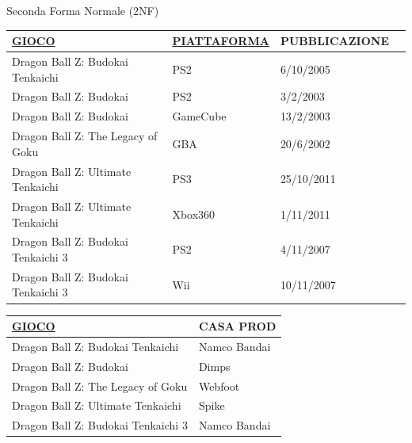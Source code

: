 \begin{frame}{Seconda Forma Normale (2NF)}
\begin{minipage}[t]{0.45\textwidth}
    \tiny
    \begin{tabular}{| p{1.5cm} | p{2cm} | p{2cm} | p{1.5cm} |}
        \hline
        \rowcolor{cyan!30} \textbf{\underline{GIOCO}} & \textbf{\underline{PIATTAFORMA}} & \textbf{PUBBLICAZIONE} \\ \hline
        Dragon Ball Z: Budokai Tenkaichi & PS2 & 6/10/2005 \\ \hline
        Dragon Ball Z: Budokai & PS2 & 3/2/2003 \\ \hline
        Dragon Ball Z: Budokai & GameCube & 13/2/2003 \\ \hline
        Dragon Ball Z: The Legacy of Goku & GBA & 20/6/2002 \\ \hline
        Dragon Ball Z: Ultimate Tenkaichi & PS3 & 25/10/2011 \\ \hline
        Dragon Ball Z: Ultimate Tenkaichi & Xbox360 & 1/11/2011 \\ \hline
        Dragon Ball Z: Budokai Tenkaichi 3 & PS2 & 4/11/2007 \\ \hline
        Dragon Ball Z: Budokai Tenkaichi 3 & Wii & 10/11/2007 \\ \hline
    \end{tabular}
\end{minipage}
\hfill
\begin{minipage}[t]{0.45\textwidth}
\begin{table}[h]
    \centering
    \scriptsize
    \vspace{-3cm}
    \begin{tabular}{| p{1.5cm} | p{1.5cm} |}
        \hline
        \rowcolor{cyan!30} \textbf{\underline{GIOCO}} & \textbf{CASA PROD} \\ \hline
        Dragon Ball Z: Budokai Tenkaichi & Namco Bandai \\ \hline
        Dragon Ball Z: Budokai & Dimps \\ \hline
        Dragon Ball Z: The Legacy of Goku & Webfoot \\ \hline
        Dragon Ball Z: Ultimate Tenkaichi & Spike \\ \hline
        Dragon Ball Z: Budokai Tenkaichi 3 & Namco Bandai \\ \hline
    \end{tabular}
\end{table}
\end{minipage}
\end{frame}

